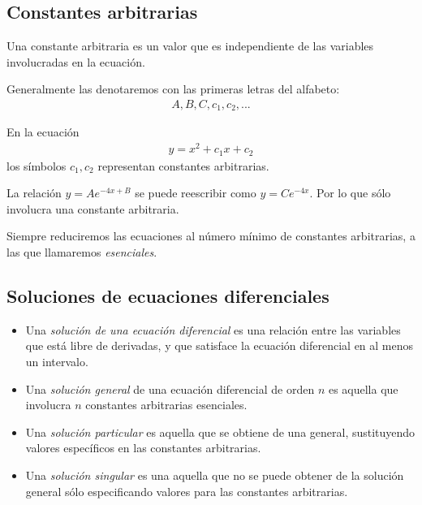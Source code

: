 \subsection{Constantes arbitrarias}

	Una constante arbitraria es un valor que es independiente de las variables involucradas en la ecuación.

	Generalmente las denotaremos con las primeras letras del alfabeto:
	\begin{align*}
		A,B,C,c_{1},c_{2},...
	\end{align*}


	\begin{ejemplo}
		En la ecuación
		\begin{align*}
		y = x^{2}+c_{1}x+c_{2}
		\end{align*}
		los símbolos $ c_{1}, c_{2} $ representan constantes arbitrarias.

	\end{ejemplo}


	\begin{ejemplo}
		La relación $ y = Ae^{-4x+B} $ se puede reescribir como $ y = Ce^{-4x} $.  Por lo que sólo involucra una constante arbitraria.
	\end{ejemplo}

\begin{observacion}

	Siempre reduciremos las ecuaciones al número mínimo de constantes arbitrarias, a las que llamaremos \emph{esenciales}.

\end{observacion}
\subsection{Soluciones de ecuaciones diferenciales}

\begin{itemize}
	\item 	Una \emph{solución de una ecuación diferencial} es una relación entre las variables que está libre de derivadas, y que satisface la ecuación diferencial en al menos un intervalo.
	\item
	Una \emph{solución general} de una ecuación diferencial de orden $ n $ es aquella que involucra $ n $ constantes arbitrarias esenciales.
	\item 	Una \emph{solución particular} es aquella que se obtiene de una general, sustituyendo valores específicos en las constantes arbitrarias.
	\item 	Una \emph{solución singular} es una aquella que no se puede obtener de la solución general sólo especificando valores para las constantes arbitrarias.
\end{itemize}

